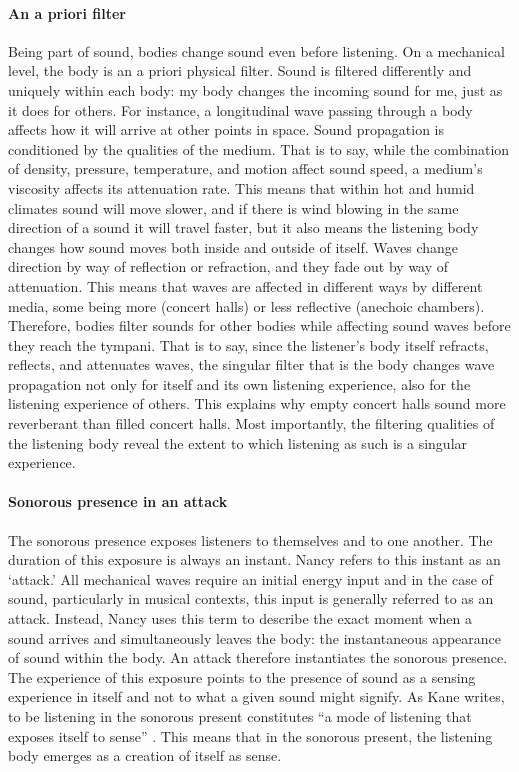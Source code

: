 \paragraph{An a priori filter}
Being part of sound, bodies change sound even before listening. On a mechanical level, the body is an a priori physical filter. Sound is filtered differently and uniquely within each body: my body changes the incoming sound for me, just as it does for others. For instance, a longitudinal wave passing through a body affects how it will arrive at other points in space. Sound propagation is conditioned by the qualities of the medium. That is to say, while the combination of density, pressure, temperature, and motion affect sound speed, a medium’s viscosity affects its attenuation rate. This means that within hot and humid climates sound will move slower, and if there is wind blowing in the same direction of a sound it will travel faster, but it also means the listening body changes how sound moves both inside and outside of itself. Waves change direction by way of reflection or refraction, and they fade out by way of attenuation. This means that waves are affected in different ways by different media, some being more (concert halls) or less reflective (anechoic chambers). Therefore, bodies filter sounds for other bodies while affecting sound waves before they reach the tympani. That is to say, since the listener’s body itself refracts, reflects, and attenuates waves, the singular filter that is the body changes wave propagation not only for itself and its own listening experience, also for the listening experience of others. This explains why empty concert halls sound more reverberant than filled concert halls. Most importantly, the filtering qualities of the listening body reveal the extent to which listening as such is a singular experience.

\paragraph{Sonorous presence in an attack}
The sonorous presence exposes listeners to themselves and to one another. The duration of this exposure is always an instant. Nancy refers to this instant as an `attack.' All mechanical waves require an initial energy input and in the case of sound, particularly in musical contexts, this input is generally referred to as an attack. Instead, Nancy uses this term to describe the exact moment when a sound arrives and simultaneously leaves the body: the instantaneous appearance of sound within the body. An attack therefore instantiates the sonorous presence. The experience of this exposure points to the presence of sound as a sensing experience in itself and not to what a given sound might signify. As Kane writes, to be listening in the sonorous present constitutes ``a mode of listening that exposes itself to sense'' \parencite[143-144]{Gra15:The}. This means that in the sonorous present, the listening body emerges as a creation of itself as sense.


